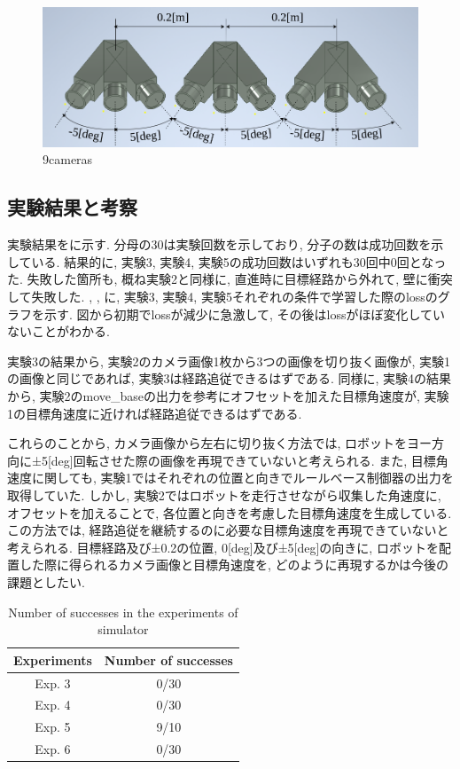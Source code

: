 \begin{figure}[h]
  \centering
  \includegraphics[keepaspectratio, scale=0.35]{images/9cam_draw.png}
  \caption{9cameras}
  \label{Fig:9cam}
\end{figure}

\newpage
\subsection{実験結果と考察}
実験結果をに示す. 分母の30は実験回数を示しており, 分子の数は成功回数を示している. 結果的に, 実験3, 実験4, 実験5の成功回数はいずれも30回中0回となった. 失敗した箇所も, 概ね実験2と同様に, 直進時に目標経路から外れて, 壁に衝突して失敗した. , , に, 実験3, 実験4, 実験5それぞれの条件で学習した際のlossのグラフを示す. 図から初期でlossが減少に急激して, その後はlossがほぼ変化していないことがわかる. 
\par 実験3の結果から, 実験2のカメラ画像1枚から3つの画像を切り抜く画像が, 実験1の画像と同じであれば, 実験3は経路追従できるはずである. 同様に, 実験4の結果から, 実験2のmove\_baseの出力を参考にオフセットを加えた目標角速度が, 実験1の目標角速度に近ければ経路追従できるはずである. 
\par これらのことから, カメラ画像から左右に切り抜く方法では, ロボットをヨー方向に±5[deg]回転させた際の画像を再現できていないと考えられる. また, 目標角速度に関しても, 実験1ではそれぞれの位置と向きでルールベース制御器の出力を取得していた. しかし, 実験2ではロボットを走行させながら収集した角速度に, オフセットを加えることで, 各位置と向きを考慮した目標角速度を生成している. この方法では, 経路追従を継続するのに必要な目標角速度を再現できていないと考えられる. 目標経路及び±0.2の位置, 0[deg]及び±5[deg]の向きに, ロボットを配置した際に得られるカメラ画像と目標角速度を, どのように再現するかは今後の課題としたい. 

\newpage
\begin{table}[h]
  \centering
  \caption{Number of successes in the experiments of simulator}
  \begin{tabular}{|c|c|} \hline
      Experiments & Number of successes \\ \hline
      Exp. 3 & 0/30 \\ \hline
      Exp. 4 & 0/30 \\ \hline
      Exp. 5 & 9/10 \\ \hline
      Exp. 6 & 0/30 \\ \hline
    \end{tabular}
  \label{tb:inves}
\end{table}

